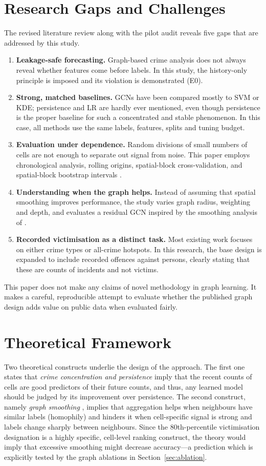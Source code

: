 \documentclass[11pt,a4paper]{report}
\begin{document}
\section{Research Gaps and Challenges}
The revised literature review along with the pilot audit reveals five gaps that are addressed by this study.
\begin{enumerate}
\item \textbf{Leakage-safe forecasting.} Graph-based crime analysis does not always reveal whether features come before labels. In this study, the history-only principle is imposed and its violation is demonstrated (E0).
\item \textbf{Strong, matched baselines.} GCNs have been compared mostly to SVM or KDE; persistence and LR are hardly ever mentioned, even though persistence is the proper baseline for such a concentrated and stable phenomenon. In this case, all methods use the same labels, features, splits and tuning budget.
\item \textbf{Evaluation under dependence.} Random divisions of small numbers of cells are not enough to separate out signal from noise. This paper employs chronological analysis, rolling origins, spatial-block cross-validation, and spatial-block bootstrap intervals \citep{roberts2017}.
\item \textbf{Understanding when the graph helps.} Instead of assuming that spatial smoothing improves performance, the study varies graph radius, weighting and depth, and evaluates a residual GCN inspired by the smoothing analysis of \citet{li2018}.
\item \textbf{Recorded victimisation as a distinct task.} Most existing work focuses on either crime types or all-crime hotspots. In this research, the base design is expanded to include recorded offences against persons, clearly stating that these are counts of incidents and not victims.
\end{enumerate}
This paper does not make any claims of novel methodology in graph learning. It makes a careful, reproducible attempt to evaluate whether the published graph design adds value on public data when evaluated fairly.

\section{Theoretical Framework}
Two theoretical constructs underlie the design of the approach. The first one states that \emph{crime concentration and persistence} \citep{weisburd2015,bowers2004} imply that the recent counts of cells are good predictors of their future counts, and thus, any learned model should be judged by its improvement over persistence. The second construct, namely \emph{graph smoothing} \citep{kipf2017,li2018}, implies that aggregation helps when neighbours have similar labels (homophily) and hinders it when cell-specific signal is strong and labels change sharply between neighbours. Since the 80th-percentile victimisation designation is a highly specific, cell-level ranking construct, the theory would imply that excessive smoothing might decrease accuracy---a prediction which is explicitly tested by the graph ablations in Section~\ref{sec:ablation}.
\end{document}
